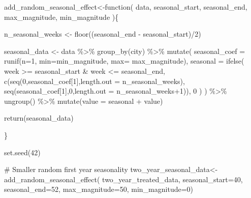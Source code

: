 \documentclass[
  letterpaper,
  DIV=11,
  numbers=noendperiod]{scrreprt}
\newenvironment{Shaded}{\begin{snugshade}}{\end{snugshade}}
\newcommand{\AttributeTok}[1]{\textcolor[rgb]{0.40,0.45,0.13}{#1}}
\newcommand{\CommentTok}[1]{\textcolor[rgb]{0.37,0.37,0.37}{#1}}
\newcommand{\ControlFlowTok}[1]{\textcolor[rgb]{0.00,0.23,0.31}{#1}}
\newcommand{\DecValTok}[1]{\textcolor[rgb]{0.68,0.00,0.00}{#1}}
\newcommand{\FunctionTok}[1]{\textcolor[rgb]{0.28,0.35,0.67}{#1}}
\newcommand{\NormalTok}[1]{\textcolor[rgb]{0.00,0.23,0.31}{#1}}
\newcommand{\OtherTok}[1]{\textcolor[rgb]{0.00,0.23,0.31}{#1}}
\newcommand{\SpecialCharTok}[1]{\textcolor[rgb]{0.37,0.37,0.37}{#1}}
\begin{document}
\begin{Shaded}
\begin{Highlighting}[]
\NormalTok{add\_random\_seasonal\_effect}\OtherTok{\textless{}{-}}\ControlFlowTok{function}\NormalTok{(}
\NormalTok{    data,}
\NormalTok{    seasonal\_start,}
\NormalTok{    seasonal\_end,}
\NormalTok{    max\_magnitude,}
\NormalTok{    min\_magnitude}
\NormalTok{)\{}

\NormalTok{  n\_seasonal\_weeks }\OtherTok{\textless{}{-}} \FunctionTok{floor}\NormalTok{((seasonal\_end }\SpecialCharTok{{-}}\NormalTok{ seasonal\_start)}\SpecialCharTok{/}\DecValTok{2}\NormalTok{)}

\NormalTok{  seasonal\_data }\OtherTok{\textless{}{-}}\NormalTok{ data }\SpecialCharTok{\%\textgreater{}\%}
    \FunctionTok{group\_by}\NormalTok{(city) }\SpecialCharTok{\%\textgreater{}\%}
    \FunctionTok{mutate}\NormalTok{(}
    \AttributeTok{seasonal\_coef =} \FunctionTok{runif}\NormalTok{(}\AttributeTok{n=}\DecValTok{1}\NormalTok{, }\AttributeTok{min=}\NormalTok{min\_magnitude, }\AttributeTok{max=}\NormalTok{ max\_magnitude),}
    \AttributeTok{seasonal =}  \FunctionTok{ifelse}\NormalTok{(}
\NormalTok{      week }\SpecialCharTok{\textgreater{}=}\NormalTok{ seasonal\_start }\SpecialCharTok{\&}\NormalTok{ week }\SpecialCharTok{\textless{}=}\NormalTok{ seasonal\_end,}
      \FunctionTok{c}\NormalTok{(}\FunctionTok{seq}\NormalTok{(}\DecValTok{0}\NormalTok{,seasonal\_coef[}\DecValTok{1}\NormalTok{],}\AttributeTok{length.out =}\NormalTok{ n\_seasonal\_weeks),}
      \FunctionTok{seq}\NormalTok{(seasonal\_coef[}\DecValTok{1}\NormalTok{],}\DecValTok{0}\NormalTok{,}\AttributeTok{length.out =}\NormalTok{ n\_seasonal\_weeks}\SpecialCharTok{+}\DecValTok{1}\NormalTok{)),}
      \DecValTok{0}
\NormalTok{      )}
\NormalTok{    ) }\SpecialCharTok{\%\textgreater{}\%}
    \FunctionTok{ungroup}\NormalTok{() }\SpecialCharTok{\%\textgreater{}\%}
    \FunctionTok{mutate}\NormalTok{(}\AttributeTok{value =}\NormalTok{ seasonal }\SpecialCharTok{+}\NormalTok{ value)}

  \FunctionTok{return}\NormalTok{(seasonal\_data)}

\NormalTok{\}}


\FunctionTok{set.seed}\NormalTok{(}\DecValTok{42}\NormalTok{)}

\CommentTok{\# Smaller random first year seasonality}
\NormalTok{two\_year\_seasonal\_data}\OtherTok{\textless{}{-}}\FunctionTok{add\_random\_seasonal\_effect}\NormalTok{(}
\NormalTok{  two\_year\_treated\_data,}
  \AttributeTok{seasonal\_start=}\DecValTok{40}\NormalTok{,}
  \AttributeTok{seasonal\_end=}\DecValTok{52}\NormalTok{,}
  \AttributeTok{max\_magnitude=}\DecValTok{50}\NormalTok{,}
  \AttributeTok{min\_magnitude=}\DecValTok{0}\NormalTok{)}


\end{Highlighting}
\end{Shaded}
\end{document}
